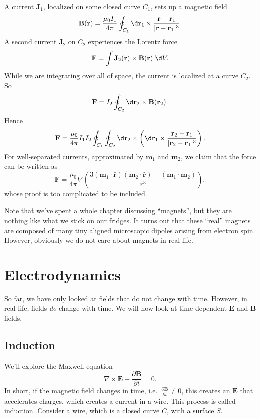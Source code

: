 \documentclass[a4paper]{article}
\begin{document}
\begin{eg}
  A current $\mathbf{J}_1$, localized on some closed curve $C_1$, sets up a magnetic field
  \[
    \mathbf{B}(\mathbf{r}) = \frac{\mu_0I_1}{4\pi}\oint_{C_1} \d \mathbf{r}_1 \times \frac{\mathbf{r} - \mathbf{r}_1}{|\mathbf{r} - \mathbf{r}_1|^3}.
  \]
  A second current $\mathbf{J}_2$ on $C_2$ experiences the Lorentz force
  \[
    \mathbf{F} = \int \mathbf{J}_2(\mathbf{r})\times \mathbf{B}(\mathbf{r})\;\d V.
  \]
  While we are integrating over all of space, the current is localized at a curve $C_2$. So
  \[
    \mathbf{F} = I_2\oint_{C_2} \d \mathbf{r}_2 \times \mathbf{B}(\mathbf{r}_2).
  \]
  Hence
  \[
    \mathbf{F} = \frac{\mu_0}{4\pi} I_1 I_2 \oint_{C_1}\oint_{C_2}\d \mathbf{r}_2\times \left(\d \mathbf{r}_1\times \frac{\mathbf{r}_2 - \mathbf{r}_1}{|\mathbf{r}_2 - \mathbf{r}_1|^3}\right).
  \]
  For well-separated currents, approximated by $\mathbf{m}_1$ and $\mathbf{m}_2$, we claim that the force can be written as
  \[
    \mathbf{F} = \frac{\mu_0}{4\pi}\nabla\left(\frac{3(\mathbf{m}_1\cdot \hat{\mathbf{r}})(\mathbf{m}_2\cdot \hat{\mathbf{r}}) - (\mathbf{m}_1\cdot \mathbf{m}_2)}{r^3}\right),
  \]
  whose proof is too complicated to be included.
\end{eg}

Note that we've spent a whole chapter discussing ``magnets'', but they are nothing like what we stick on our fridges. It turns out that these ``real'' magnets are composed of many tiny aligned microscopic dipoles arising from electron spin. However, obviously we do not care about magnets in real life.

\section{Electrodynamics}
So far, we have only looked at fields that do not change with time. However, in real life, fields \emph{do} change with time. We will now look at time-dependent $\mathbf{E}$ and $\mathbf{B}$ fields.
\subsection{Induction}
We'll explore the Maxwell equation
\[
  \nabla\times \mathbf{E} + \frac{\partial \mathbf{B}}{\partial t} = 0.
\]
In short, if the magnetic field changes in time, i.e.\ $\frac{\partial \mathbf{B}}{\partial t} \not = 0$, this creates an $\mathbf{E}$ that accelerates charges, which creates a current in a wire. This process is called induction. Consider a wire, which is a closed curve $C$, with a surface $S$.
\end{document}

